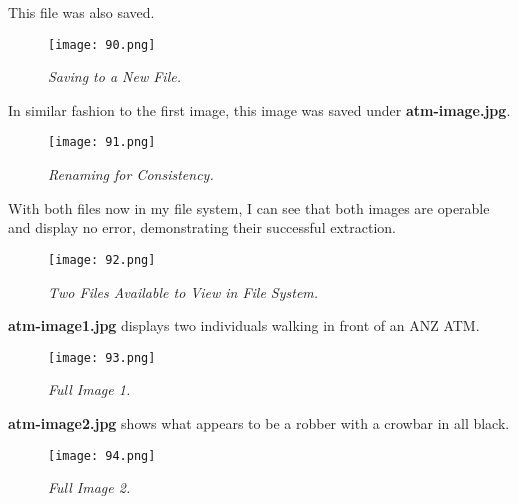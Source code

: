 This file was also saved.

\begin{figure}[H]
    \setlength{\abovecaptionskip}{20pt}
    \setlength{\belowcaptionskip}{0pt}
    \centering
    \texttt{[image: 90.png]}
    \captionsetup{justification=centering}
    \caption{\textit{Saving to a New File.}}
    \label{fig:90}
\end{figure}
\vspace{-10pt}

In similar fashion to the first image, this image was saved under \textbf{atm-image.jpg}. 

\begin{figure}[H]
    \setlength{\abovecaptionskip}{20pt}
    \setlength{\belowcaptionskip}{0pt}
    \centering
    \texttt{[image: 91.png]}
    \captionsetup{justification=centering}
    \caption{\textit{Renaming for Consistency.}}
    \label{fig:91}
\end{figure}
\vspace{-10pt}

With both files now in my file system, I can see that both images are operable and display no error, demonstrating their successful extraction.

\begin{figure}[H]
    \setlength{\abovecaptionskip}{20pt}
    \setlength{\belowcaptionskip}{0pt}
    \centering
    \texttt{[image: 92.png]}
    \captionsetup{justification=centering}
    \caption{\textit{Two Files Available to View in File System.}}
    \label{fig:92}
\end{figure}
\vspace{-10pt}

\textbf{atm-image1.jpg} displays two individuals walking in front of an ANZ ATM. 

\begin{figure}[H]
    \setlength{\abovecaptionskip}{20pt}
    \setlength{\belowcaptionskip}{0pt}
    \centering
    \texttt{[image: 93.png]}
    \captionsetup{justification=centering}
    \caption{\textit{Full Image 1.}}
    \label{fig:93}
\end{figure}
\vspace{-10pt}

\textbf{atm-image2.jpg} shows what appears to be a robber with a crowbar in all black.

\begin{figure}[H]
    \setlength{\abovecaptionskip}{20pt}
    \setlength{\belowcaptionskip}{0pt}
    \centering
    \texttt{[image: 94.png]}
    \captionsetup{justification=centering}
    \caption{\textit{Full Image 2.}}
    \label{fig:94}
\end{figure}
\vspace{-10pt}

